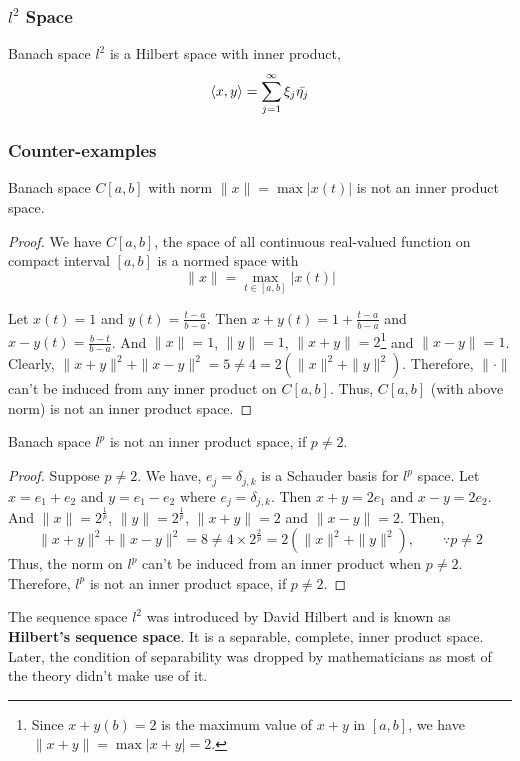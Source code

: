 \subsubsection{$l^2$ Space}
	Banach space $l^2$ is a Hilbert space with inner product,
	\[ \left\langle x,y \right\rangle = \sum_{j=1}^\infty \xi_j \bar{\eta_j} \]
\subsubsection{Counter-examples}
\begin{remark}
	Banach space $C[a,b]$ with norm $\|x\| = \max |x(t)|$ is not an inner product space.
\end{remark}
\begin{proof}
	We have $C[a,b]$, the space of all continuous real-valued function on compact interval $[a,b]$ is a normed space with \[ \|x\| = \max_{t \in [a,b]} |x(t)| \]

	Let $x(t) = 1$ and $y(t) = \frac{t-a}{b-a}$.
	Then $x+y(t) = 1+\frac{t-a}{b-a}$ and $x-y(t) = \frac{b-t}{b-a}$.
	And $\|x\| = 1$, $\|y\| =1$, $\|x+y\| = 2$\dag\footnote{Since $x+y(b) = 2$ is the maximum value of $x+y$ in $[a,b]$, we have $\|x+y\| = \max |x+y| = 2$.} and $\|x-y\| = 1$.
	Clearly, $\|x+y\|^2 + \|x-y\|^2 = 5 \ne 4 = 2(\|x\|^2+\|y\|^2)$.
	Therefore, $\| \cdot \|$ can't be induced from any inner product on $C[a,b]$.
	Thus, $C[a,b]$ (with above norm) is not an inner product space.
\end{proof}

\begin{remark}
	Banach space $l^p$ is not an inner product space, if $p \ne 2$.
\end{remark}
\begin{proof}
	Suppose $p \ne 2$.
	We have, $e_j = \delta_{j,k}$ is a Schauder basis for $l^p$ space.
	Let $x = e_1+e_2$ and $y = e_1-e_2$ where $e_j = \delta_{j,k}$.
	Then $x+y = 2e_1$ and $x-y = 2e_2$.
	And $\|x\| = 2^\frac{1}{p}$, $\|y\| = 2^\frac{1}{p}$, $\|x+y\| = 2$ and $\|x-y\| = 2$.
	Then, 
	\[ \|x+y\|^2+\|x-y\|^2 = 8 \ne 4 \times 2^\frac{2}{p} = 2(\|x\|^2+\|y\|^2), \qquad \because p \ne 2\]
	Thus, the norm on $l^p$ can't be induced from an inner product when $p \ne 2$.
	Therefore, $l^p$ is not an inner product space, if $p \ne 2$.
\end{proof}

\begin{commentary}
\begin{remark}[Hilbert]
	The sequence space $l^2$ was introduced by David Hilbert  and is known as \textbf{Hilbert's sequence space}.
	It is a separable, complete, inner product space.
	Later, the condition of separability was dropped by mathematicians as most of the theory didn't make use of it.
\end{remark}
\end{commentary}

